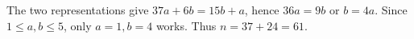 The two representations give $37a+6b=15b+a$, hence $36a=9b$ or $b=4a$. Since $1\le a,b\le5$, only $a=1,b=4$ works. Thus $n=37+24=\boxed{61}$.
